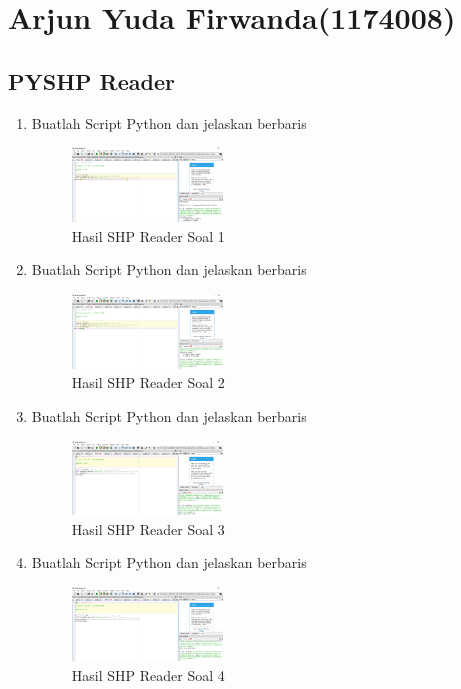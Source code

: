 \section{Arjun Yuda Firwanda(1174008)}
\subsection{PYSHP Reader}
\begin{enumerate}
    \item Buatlah Script Python dan jelaskan berbaris
    
    \hfill\break
    \begin{figure}[H]
		\includegraphics[width=4cm]{figures/1174008/3/soal1.PNG}
		\centering
		\caption{Hasil SHP Reader Soal 1}
    \end{figure}
    
    \item Buatlah Script Python dan jelaskan berbaris
    
    \hfill\break
    \begin{figure}[H]
		\includegraphics[width=4cm]{figures/1174008/3/soal2.PNG}
		\centering
		\caption{Hasil SHP Reader Soal 2}
    \end{figure}
    
    \item Buatlah Script Python dan jelaskan berbaris
    
    \hfill\break
    \begin{figure}[H]
		\includegraphics[width=4cm]{figures/1174008/3/soal3.PNG}
		\centering
		\caption{Hasil SHP Reader Soal 3}
    \end{figure}
    
    \item Buatlah Script Python dan jelaskan berbaris
    
    \hfill\break
    \begin{figure}[H]
		\includegraphics[width=4cm]{figures/1174008/3/soal4.PNG}
		\centering
		\caption{Hasil SHP Reader Soal 4}
    \end{figure}
    

\end{enumerate}
